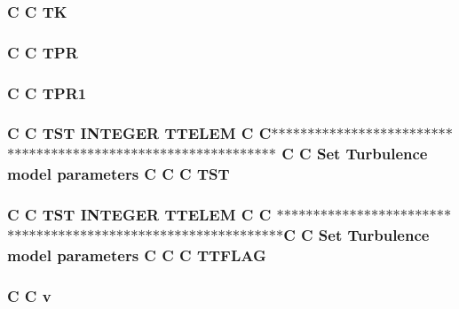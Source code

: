 \hypertarget{turb_8com_ae11f19404c6108c51e039cc2c51e03f9}{
\subsubsection[{T\-K}]{\setlength{\rightskip}{0pt plus 5cm}C C T\-K}}\label{turb_8com_ae11f19404c6108c51e039cc2c51e03f9}
\hypertarget{turb_8com_a1cdd3ae76891adc9d5f8b97f568754f7}{
\subsubsection[{T\-P\-R}]{\setlength{\rightskip}{0pt plus 5cm}C C T\-P\-R}}\label{turb_8com_a1cdd3ae76891adc9d5f8b97f568754f7}
\hypertarget{turb_8com_ae1602f83f51f820f66d55f31c5644321}{
\subsubsection[{T\-P\-R1}]{\setlength{\rightskip}{0pt plus 5cm}C C T\-P\-R1}}\label{turb_8com_ae1602f83f51f820f66d55f31c5644321}
\hypertarget{turb_8com_a677fc6bb107acfd381357f761464b300}{
\subsubsection[{T\-S\-T}]{\setlength{\rightskip}{0pt plus 5cm}C C T\-S\-T I\-N\-T\-E\-G\-E\-R T\-T\-E\-L\-E\-M C C$\ast$$\ast$$\ast$$\ast$$\ast$$\ast$$\ast$$\ast$$\ast$$\ast$$\ast$$\ast$$\ast$$\ast$$\ast$$\ast$$\ast$$\ast$$\ast$$\ast$$\ast$$\ast$$\ast$$\ast$$\ast$$\ast$$\ast$$\ast$$\ast$$\ast$$\ast$$\ast$$\ast$$\ast$$\ast$$\ast$$\ast$$\ast$$\ast$$\ast$$\ast$$\ast$$\ast$$\ast$$\ast$$\ast$$\ast$$\ast$$\ast$$\ast$$\ast$$\ast$$\ast$$\ast$$\ast$$\ast$$\ast$$\ast$$\ast$$\ast$$\ast$$\ast$ C C Set Turbulence model parameters C C C T\-S\-T}}\label{turb_8com_a677fc6bb107acfd381357f761464b300}
\hypertarget{turb_8com_ab410312bc7ffadaca38025fc3fe530a8}{
\subsubsection[{T\-T\-F\-L\-A\-G}]{\setlength{\rightskip}{0pt plus 5cm}C C {\bf T\-S\-T} I\-N\-T\-E\-G\-E\-R T\-T\-E\-L\-E\-M C C $\ast$$\ast$$\ast$$\ast$$\ast$$\ast$$\ast$$\ast$$\ast$$\ast$$\ast$$\ast$$\ast$$\ast$$\ast$$\ast$$\ast$$\ast$$\ast$$\ast$$\ast$$\ast$$\ast$$\ast$$\ast$$\ast$$\ast$$\ast$$\ast$$\ast$$\ast$$\ast$$\ast$$\ast$$\ast$$\ast$$\ast$$\ast$$\ast$$\ast$$\ast$$\ast$$\ast$$\ast$$\ast$$\ast$$\ast$$\ast$$\ast$$\ast$$\ast$$\ast$$\ast$$\ast$$\ast$$\ast$$\ast$$\ast$$\ast$$\ast$$\ast$$\ast$C C Set Turbulence model parameters C C C T\-T\-F\-L\-A\-G}}\label{turb_8com_ab410312bc7ffadaca38025fc3fe530a8}
\hypertarget{turb_8com_a8961853e9a171af64fe80e35da93a2e0}{
\subsubsection[{v}]{\setlength{\rightskip}{0pt plus 5cm}C C v}}\label{turb_8com_a8961853e9a171af64fe80e35da93a2e0}

